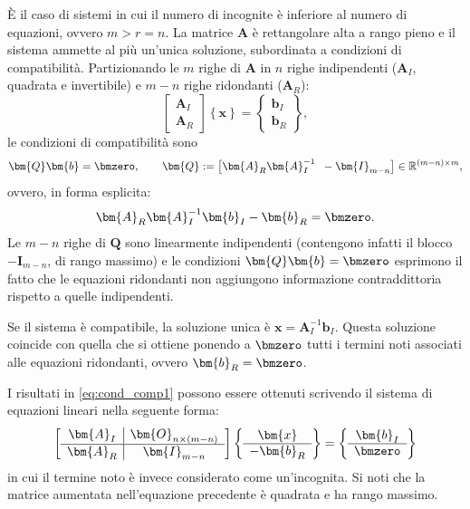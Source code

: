 È il caso di sistemi in cui il numero di incognite è inferiore 	al numero di equazioni, ovvero $m>r=n$. La matrice $\bm{A}$ è 
rettangolare alta a rango pieno e il sistema ammette al più un'unica soluzione, subordinata a condizioni di compatibilit\`a.
Partizionando le $m$ righe di $\bm{A}$ in $n$ righe indipendenti ($\bm{A}_I$, quadrata e invertibile) e $m-n$ righe ridondanti ($\bm{A}_R$):
\begin{equation}\label{eq:sist_sovrad}
	\left[ \begin{array}{c} \bm{A}_{I} \\ \hline \bm{A}_{R} \end{array} \right]
	\left\{ \bm{x}\right\}
	= \left\{ \begin{array}{c} \bm{b}_{I} \\ \hline \bm{b}_{R} \end{array} \right\},
\end{equation}
le condizioni di compatibilit\`a sono
\begin{equation}\label{eq:comp_sovrad}
	\bm{Q} \bm{b} = \bmzero,
	\qquad
	\bm{Q} := \bigl[\bm{A}_{R}\bm{A}_{I}^{-1} \;\; -\bm{I}_{m-n}\bigr] \in \mathbb{R}^{(m-n)\times m},
\end{equation}
ovvero, in forma esplicita:
\begin{equation}\label{eq:cond_comp1}
	\bm{A}_{R} \bm{A}_I^{-1} \bm{b}_{I} - \bm{b}_{R} = \bmzero.
\end{equation}
Le $m-n$ righe di $\bm{Q}$ sono linearmente indipendenti (contengono infatti il blocco $-\bm{I}_{m-n}$, di rango massimo) e le condizioni
$\bm{Q}\bm{b}=\bmzero$ esprimono il fatto che le equazioni ridondanti non
aggiungono informazione contraddittoria rispetto a quelle indipendenti.

Se il sistema \`e compatibile, la soluzione unica \`e $\bm{x} = \bm{A}_I^{-1} \bm{b}_I$. Questa soluzione coincide con quella che si ottiene ponendo a $\bmzero$ tutti i termini noti associati alle equazioni 
ridondanti, ovvero $\bm{b}_R=\bmzero$.

\begin{oss}
	I risultati in \eqref{eq:cond_comp1} possono essere ottenuti scrivendo il sistema di equazioni lineari nella seguente forma:
	\begin{equation}\label{sist_sovrad_AL}
		\left[ \begin{array}{c|c}
			\bm{A}_I & \bm{O}_{n \times (m-n)} \\
			\hline
			\bm{A}_R & \bm{I}_{m-n}
		\end{array} \right]
		\left\{ \begin{array}{c}
			\bm{x} \\
			\hline
			-\bm{b}_{R}
		\end{array} \right\}
		=
		\left\{ \begin{array}{c}
			\bm{b}_{I} \\
			\hline
			\bmzero
		\end{array} \right\}
	\end{equation}
	in cui il termine noto è invece considerato come un'incognita. Si noti che la matrice aumentata nell'equazione precedente è quadrata e ha rango massimo.
\end{oss}



